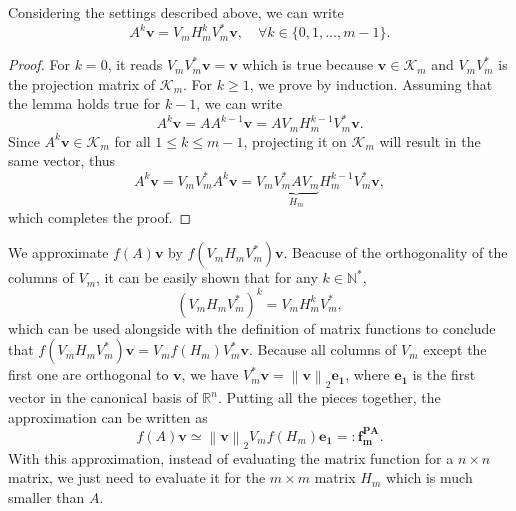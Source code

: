 \begin{lemma}
    \label{lem:krylovsubspacepowered}
    Considering the settings described above, we can write
    \begin{equation}
        A^k \mathbf{v} = V_m H_m^k V_m^* \mathbf{v}, \quad \forall k \in \{0, 1, \dots, m-1 \}.
    \end{equation}
\end{lemma}

\begin{proof}
    For $k=0$, it reads $V_m V_m^* \mathbf{v} = \mathbf{v}$ which is true because
    $\mathbf{v} \in \mathcal{K}_m$ and $V_m V_m^*$ is the projection matrix of $\mathcal{K}_m$.
    For $k \ge 1$, we prove by induction. Assuming that the lemma holds true for
    $k-1$, we can write
    \begin{equation*}
        A^{k} \mathbf{v} = A A^{k-1} \mathbf{v} = A V_m H_m^{k-1} V_m^* \mathbf{v}.
    \end{equation*}
    Since $A^{k} \mathbf{v} \in \mathcal{K}_m$ for all $1 \le k \le m-1$, projecting it on
    $\mathcal{K}_m$ will result in the same vector, thus
    \begin{equation*}
        A^{k} \mathbf{v} = V_m V_m^* A^{k} \mathbf{v}
        = V_m \underset{H_m}{\underbrace{V_m^* A V_m}} H_m^{k-1} V_m^* \mathbf{v},
    \end{equation*}
    which completes the proof.
\end{proof}

We approximate $f(A)\mathbf{v}$ by $f(V_m H_m V_m^*)\mathbf{v}$. Beacuse of the orthogonality
of the columns of $V_m$, it can be easily shown that for any $k \in \mathbb{N^{*}}$,
\begin{equation*}
    \label{eq:reprojectionpower}
    (V_m H_m V_m^*)^{k} = V_m H_m^k V_m^*,
\end{equation*}
which can be used alongside with the definition of matrix functions to conclude
that $f(V_m H_m V_m^*)\mathbf{v} = V_m f(H_m) V_m^* \mathbf{v}$.
Because all columns of $V_m$ except the first one are orthogonal to $\mathbf{v}$, we have
$V_m^* \mathbf{v} = \left\| \mathbf{v} \right\|_{2} \mathbf{e_1}$, where $\mathbf{e_1}$
is the first vector in the canonical basis of $\mathbb{R}^n$.
Putting all the pieces together, the approximation can be written as
\begin{equation}
    \label{eq:polynomialkrylovapproximation}
    f(A)\mathbf{v} \simeq \left\| \mathbf{v} \right\|_{2} V_m f(H_m) \mathbf{e_1}
    =: \mathbf{f_{m}^{PA}}.
\end{equation}
With this approximation, instead of evaluating the matrix function for
a $n \times n$ matrix, we just need to evaluate it for the $m \times m$ matrix
$H_m$ which is much smaller than $A$.

